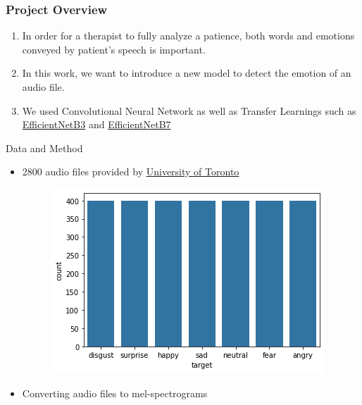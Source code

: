 \documentclass[xcolor={table}]{beamer}
\begin{document}
		\begin{frame}
			\frametitle{Project Overview}
			\begin{enumerate}
			    \item In order for a therapist to fully analyze a patience, both words and emotions conveyed by patient's speech is important.
			    \item In this work, we want to introduce a new model to detect the emotion of an audio file.
				\item We used Convolutional Neural Network as well as Transfer Learnings such as \textcolor{blue}{\href{https://www.tensorflow.org/api_docs/python/tf/keras/applications/efficientnet/EfficientNetB3}{EfficientNetB3}} and \textcolor{blue}{\href{https://www.tensorflow.org/api_docs/python/tf/keras/applications/efficientnet/EfficientNetB7}{EfficientNetB7}}
			\end{enumerate}
		\end{frame}
\begin{frame}{Data and Method}
\begin{itemize}
    \item 2800 audio files provided by 
     \textcolor{blue}{\href{https://tspace.library.utoronto.ca/handle/1807/24487}{University of Toronto}} 
     
     \begin{figure}
        \includegraphics[width=0.5\linewidth]{distribution.png}
    \end{figure}
     
    \item Converting audio files to mel-spectrograms
    \end{itemize}
   
\end{frame}
\end{document}
